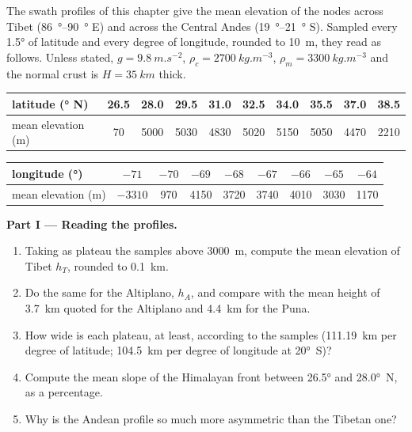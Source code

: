 \begin{problem}\label{pb:b2:himalaya-andes:1}
The swath profiles of this chapter give the mean elevation of the nodes across Tibet
(\qtyrange{86}{90}{\degree} E) and across the Central Andes (\qtyrange{19}{21}{\degree} S).
Sampled every \ang{1.5} of latitude and every degree of longitude, rounded to \qty{10}{m}, they
read as follows. Unless stated, $g = \qty{9.8}{m.s^{-2}}$, $\rho_c = \qty{2700}{kg.m^{-3}}$,
$\rho_m = \qty{3300}{kg.m^{-3}}$ and the normal crust is $H = \qty{35}{km}$ thick.

\smallskip
\begin{center}\small
\begin{tabular}{l|ccccccccc}
latitude (\unit{\degree} N) & 26.5 & 28.0 & 29.5 & 31.0 & 32.5 & 34.0 & 35.5 & 37.0 & 38.5 \\ \hline
mean elevation (\unit{m}) & 70 & 5000 & 5030 & 4830 & 5020 & 5150 & 5050 & 4470 & 2210
\end{tabular}

\smallskip
\begin{tabular}{l|cccccccc}
longitude (\unit{\degree}) & $-71$ & $-70$ & $-69$ & $-68$ & $-67$ & $-66$ & $-65$ & $-64$ \\ \hline
mean elevation (\unit{m}) & $-3310$ & 970 & 4150 & 3720 & 3740 & 4010 & 3030 & 1170
\end{tabular}
\end{center}
\smallskip

\noindent\textbf{Part I --- Reading the profiles.}
\begin{enumerate}
\item Taking as plateau the samples above \qty{3000}{m}, compute the mean elevation of Tibet
$h_T$, rounded to \qty{0.1}{km}.
\item Do the same for the Altiplano, $h_A$, and compare with the mean height of
\qty{3.7}{km} quoted for the Altiplano and \qty{4.4}{km} for the Puna.
\item How wide is each plateau, at least, according to the samples (\qty{111.19}{km} per
degree of latitude; \qty{104.5}{km} per degree of longitude at \ang{20}~S)?
\item Compute the mean slope of the Himalayan front between \ang{26.5} and \ang{28.0}~N, as
a percentage.
\item Why is the Andean profile so much more asymmetric than the Tibetan one?
\end{enumerate}


\end{problem}

